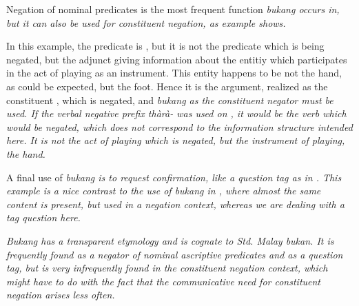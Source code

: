 
Negation of nominal predicates is the most frequent function \em bukang \em occurs in, but it can also be used for constituent negation, as example  shows.



In this example, the predicate is , but it is not the predicate which is being negated, but the adjunct giving information about the entitiy which participates in the act of playing as an instrument. This entity happens to be not the hand, as could be expected, but the foot. Hence it is the argument, realized as the constituent , which is negated, and \em bukang \em as the constituent negator must be used. If the verbal negative prefix \em thàrà- \em was used on , it would be the verb which would be negated, which does not correspond to the information structure intended here. It is not the act of playing which is negated, but the instrument of playing, the hand.

A final use of \em bukang \em is to request confirmation, like a question tag as in . This example is a nice contrast to the use of \em bukang \em in , where almost the same content is present, but used in a negation context, whereas we are dealing with a tag question here.


\em Bukang \em has a transparent etymology  and is cognate to Std. Malay \em bukan\em. It is frequently found as a negator of nominal ascriptive predicates and as a question tag, but is very infrequently found in the constituent negation context, which might have to do with the fact that the communicative need for constituent negation   arises less often.

